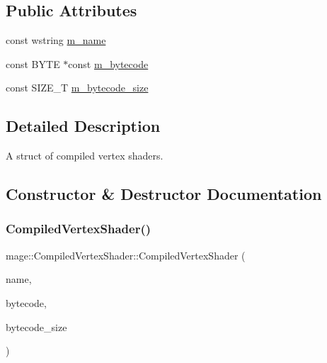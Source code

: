 \subsection*{Public Attributes}
\begin{DoxyCompactItemize}
\item 
const wstring \hyperlink{structmage_1_1_compiled_vertex_shader_af37c5f63c4146dd796c7e4df5ade4d0e}{m\+\_\+name}
\item 
const B\+Y\+TE $\ast$const \hyperlink{structmage_1_1_compiled_vertex_shader_ab416def2b374a9c55475e717dd6df540}{m\+\_\+bytecode}
\item 
const S\+I\+Z\+E\+\_\+T \hyperlink{structmage_1_1_compiled_vertex_shader_aab5b4dc130cef9a34e4ceaff22ba3a14}{m\+\_\+bytecode\+\_\+size}
\end{DoxyCompactItemize}


\subsection{Detailed Description}
A struct of compiled vertex shaders. 

\subsection{Constructor \& Destructor Documentation}
\hypertarget{structmage_1_1_compiled_vertex_shader_abb08e4d5269937f0d9741ac0f748896f}{}\label{structmage_1_1_compiled_vertex_shader_abb08e4d5269937f0d9741ac0f748896f} 
\subsubsection{\texorpdfstring{Compiled\+Vertex\+Shader()}{CompiledVertexShader()}\hspace{0.1cm}{\footnotesize\ttfamily [1/3]}}
{\footnotesize\ttfamily mage\+::\+Compiled\+Vertex\+Shader\+::\+Compiled\+Vertex\+Shader (\begin{DoxyParamCaption}\item[{const wstring \&}]{name,  }\item[{const B\+Y\+TE $\ast$}]{bytecode,  }\item[{S\+I\+Z\+E\+\_\+T}]{bytecode\+\_\+size }\end{DoxyParamCaption})\hspace{0.3cm}{\ttfamily [explicit]}}

